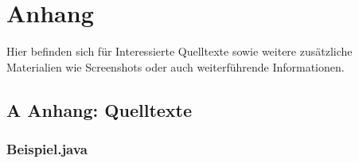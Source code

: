 {}
\chapter*{Anhang}

Hier befinden sich für Interessierte Quelltexte sowie weitere zusätzliche Materialien wie Screenshots oder auch weiterführende Informationen.

{}
\section*{A Anhang: Quelltexte}

\subsection*{Beispiel.java}\label{stegotext}

\newpage
